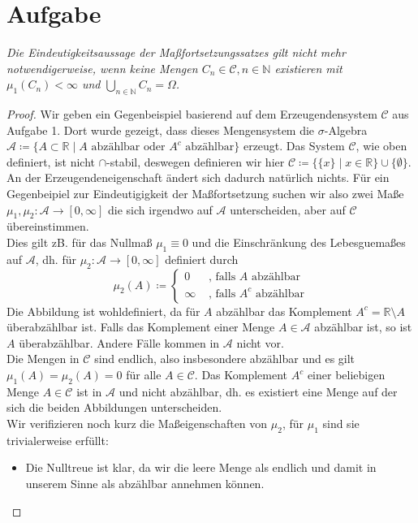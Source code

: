 \documentclass[11pt]{amsart}
\begin{document}
\section{Aufgabe}
\textit{Die Eindeutigkeitsaussage der Maßfortsetzungssatzes gilt nicht mehr notwendigerweise, wenn keine Mengen $C_n \in \mathcal{C}, n \in \mathbb{N}$ existieren mit $\mu_1(C_n) < \infty$ und $\bigcup_{n \in \mathbb{N}} C_n = \Omega$.} 
\begin{proof}
Wir geben ein Gegenbeispiel basierend auf dem Erzeugendensystem $\mathcal{C}$ aus Aufgabe 1. Dort wurde gezeigt, dass dieses Mengensystem die $\sigma$-Algebra $\mathcal{A} \coloneqq \{A \subset \mathbb{R} \;|\; A \text{ abzählbar oder } A^c \text{ abzählbar}\}$ erzeugt. Das System $\mathcal{C}$, wie oben definiert, ist nicht $\cap$-stabil, deswegen definieren wir hier $\mathcal{C} \coloneqq  \{\{x\} \;|\; x \in \mathbb{R}\} \cup \{\emptyset\}$. An der Erzeugendeneigenschaft ändert sich dadurch natürlich nichts. Für ein Gegenbeipiel zur Eindeutigigkeit der Maßfortsetzung suchen wir also zwei Maße $\mu_1, \mu_2: \mathcal{A} \rightarrow [0, \infty]$ die sich irgendwo auf $\mathcal{A}$ unterscheiden, aber auf $\mathcal{C}$ übereinstimmen. \\ 
Dies gilt zB. für das Nullmaß $\mu_1 \equiv 0$ und die Einschränkung des Lebesguemaßes auf $\mathcal{A}$, dh. für $\mu_2: \mathcal{A} \rightarrow [0, \infty]$ definiert durch 
$$
\mu_2(A) \coloneqq
\begin{cases}
0 &\text{ , falls } A \text{ abzählbar} \\ 
\infty &\text{ , falls } A^c \text{ abzählbar} 
\end{cases}
$$
Die Abbildung ist wohldefiniert, da für $A$ abzählbar das Komplement $A^c = \mathbb{R} \setminus A$ überabzählbar ist. Falls das Komplement einer Menge $A \in \mathcal{A}$ abzählbar ist, so ist $A$ überabzählbar. Andere Fälle kommen in $\mathcal{A}$ nicht vor.\\
Die Mengen in $\mathcal{C}$ sind endlich, also insbesondere abzählbar und es gilt $\mu_1(A) = \mu_2(A) = 0$ für alle $A \in \mathcal{C}$. Das Komplement $A^c$ einer beliebigen Menge $A \in \mathcal{C}$ ist in $\mathcal{A}$ und nicht abzählbar, dh. es existiert eine Menge auf der sich die beiden Abbildungen unterscheiden. \\
Wir verifizieren noch kurz die Maßeigenschaften von $\mu_2$, für $\mu_1$ sind sie trivialerweise erfüllt:
\begin{itemize}
\item Die Nulltreue ist klar, da wir die leere Menge als endlich und damit in unserem Sinne als abzählbar annehmen können.

\end{itemize}
\end{proof}
\end{document}
